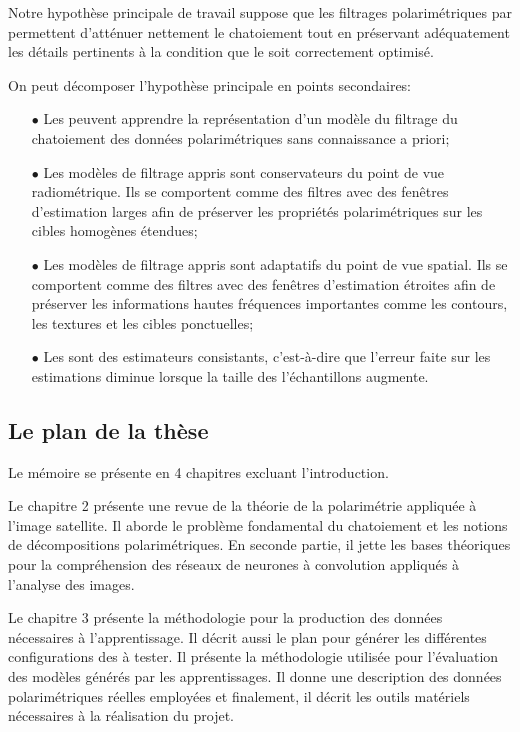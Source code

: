 Notre hypothèse principale de travail suppose que les filtrages polarimétriques par \acrconvnet permettent d'atténuer nettement le chatoiement tout en préservant adéquatement les détails pertinents à la condition que le \acrconvnet soit correctement optimisé.

On peut décomposer l'hypothèse principale en points secondaires:

\begin{enumerate}
\item [$\bullet$] Les \acrconvnet peuvent apprendre la représentation d'un modèle du filtrage du chatoiement des données polarimétriques sans connaissance a priori;
\item [$\bullet$] Les modèles de filtrage appris sont conservateurs du point de vue radiométrique. Ils se comportent comme des filtres avec des fenêtres d’estimation larges afin de préserver les propriétés polarimétriques sur les cibles homogènes étendues;
\item [$\bullet$] Les modèles de filtrage appris sont adaptatifs du point de vue spatial. Ils se comportent comme des filtres avec des fenêtres d’estimation étroites afin de préserver les informations hautes fréquences importantes comme les contours, les textures et les cibles ponctuelles;
 \item [$\bullet$] Les \acrconvnet sont des estimateurs consistants,  c'est-à-dire que l'erreur faite sur les estimations diminue lorsque la taille des l'échantillons augmente.
\end{enumerate}

\subsection{Le plan de la thèse}

Le mémoire se présente en 4 chapitres excluant l'introduction.

Le chapitre 2 présente une revue de la théorie de la polarimétrie appliquée à l'image satellite. Il aborde le problème fondamental du chatoiement et les notions de décompositions polarimétriques.  En seconde partie, il jette les bases théoriques pour la compréhension des réseaux de neurones à convolution appliqués à l'analyse des images.

Le chapitre 3 présente la méthodologie pour la production des données nécessaires à l'apprentissage. Il décrit aussi le plan pour générer les différentes configurations des \acrconvnet à tester.  Il présente la méthodologie utilisée pour l'évaluation des modèles générés par les apprentissages.  Il donne une description des données polarimétriques réelles employées et finalement, il décrit les outils matériels nécessaires à la réalisation du projet.

